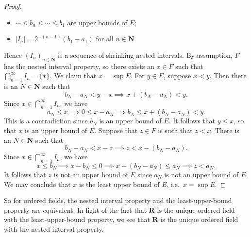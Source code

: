\documentclass[12pt]{article}
\theoremstyle{definition}
\newcommand{\N}{\mathbf{N}}
\newcommand{\R}{\mathbf{R}}
\begin{document}
\begin{proof}
\begin{itemize}
        \item \( \cdots \leq b_n \leq \cdots \leq b_1 \) are upper bounds of \( E \);
        \item \( |I_n| = 2^{-(n-1)}(b_1 - a_1) \) for all \( n \in \N \).
    \end{itemize}
    Hence \( (I_n)_{n \in \N} \) is a sequence of shrinking nested intervals. By assumption, \( F \) has the nested interval property, so there exists an \( x \in F \) such that \( \bigcap_{n=1}^{\infty} I_n = \{ x \} \). We claim that \( x = \sup E \). For \( y \in E \), suppose \( x < y \). Then there is an \( N \in \N \) such that
    \[
        b_N - a_N < y - x \implies x + (b_N - a_N) < y.
    \]
    Since \( x \in \bigcap_{n=1}^{\infty} I_n \), we have
    \[
        a_N \leq x \implies 0 \leq x - a_N \implies b_N \leq x + (b_N - a_N) < y.
    \]
    This is a contradiction since \( b_N \) is an upper bound of \( E \). It follows that \( y \leq x \), so that \( x \)  is an upper bound of \( E \). Suppose that \( z \in F \) is such that \( z < x \). There is an \( N \in \N \) such that
    \[
        b_N - a_N < x - z \implies z < x - (b_N - a_N).
    \]
    Since \( x \in \bigcap_{n=1}^{\infty} I_n \), we have
    \[
        x \leq b_N \implies x - b_N \leq 0 \implies x - (b_N - a_N) \leq a_N \implies z < a_N.
    \]
    It follows that \( z \) is not an upper bound of \( E \) since \( a_N \) is not an upper bound of \( E \). We may conclude that \( x \) is the least upper bound of \( E \), i.e.\ \( x = \sup E \).
\end{proof}

So for ordered fields, the nested interval property and the least-upper-bound property are equivalent. In light of the fact that \( \R \) is the unique ordered field with the least-upper-bound property, we see that \( \R \) is the unique ordered field with the nested interval property.
\end{document}
